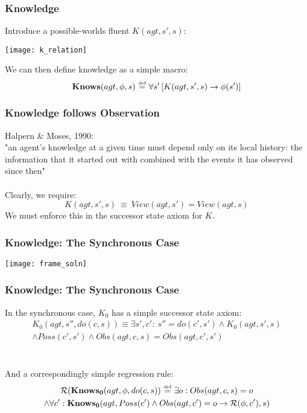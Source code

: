 \documentclass{beamer}
\newcommand{\isdef}{\hbox{$\stackrel{\mbox{\tiny def}}{=}$}}
\newcommand{\Reg}{\mathcal{R}}
\newcommand{\KnowsZ}{\mathbf{Knows_{0}}}
\begin{document}
\begin{frame}
\frametitle{Knowledge}
Introduce a possible-worlds fluent $K(agt,s',s)$:

\begin{center}
  \texttt{[image: k\_relation]}
\end{center}

We can then define knowledge as a simple macro:
\[ \mathbf{Knows}(agt,\phi,s)\ \isdef\ \forall s'\left[K(agt,s',s)\rightarrow \phi(s')\right] \]
\end{frame}

\begin{frame}
\frametitle{Knowledge follows Observation}
Halpern \& Moses, 1990:\\
"an agent's knowledge at a given time must depend only on its local history:
the information that it started out with combined with the events it has
observed since then"
\pause
\ \\
\ \\
Clearly, we require:
\begin{equation*}
K(agt,s',s)\ \equiv\ View(agt,s') = View(agt,s)
\end{equation*}
We must enforce this in the successor state axiom for $K$.
\end{frame}

\begin{frame}
\frametitle{Knowledge: The Synchronous Case}
\begin{center}
  \texttt{[image: frame\_soln]}
\end{center}
\end{frame}

\begin{frame}
\frametitle{Knowledge: The Synchronous Case}
In the synchronous case, $K_0$ has a simple successor state axiom:
\begin{multline*}
 K_0(agt,s'',do(c,s)) \equiv \exists s',c':\ s''=do(c',s') \wedge K_0(agt,s',s)\\
  \wedge Poss(c',s') \wedge Obs(agt,c,s) = Obs(agt,c',s')
\end{multline*}
\ \\
\ \\
\pause
And a correspondingly simple regression rule:
\begin{multline*}
 \Reg(\KnowsZ(agt,\phi,do(c,s))\ \isdef\ \exists o: Obs(agt,c,s)=o\\
  \wedge \forall c': \KnowsZ(agt,Poss(c')\wedge Obs(agt,c')=o \rightarrow \Reg(\phi,c'),s)
\end{multline*}
\end{frame}
\end{document}
